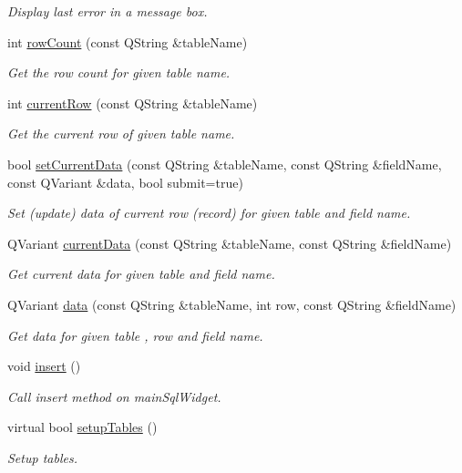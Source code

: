 \begin{DoxyCompactItemize}
\begin{DoxyCompactList}\small\item\em Display last error in a message box. \end{DoxyCompactList}\item 
int \hyperlink{classmdt_sql_form_a7d50c271fc506764ed20dd88914d0ddc}{rowCount} (const QString \&tableName)
\begin{DoxyCompactList}\small\item\em Get the row count for given table name. \end{DoxyCompactList}\item 
int \hyperlink{classmdt_sql_form_a855de08e9ddb3f7898ef4ceb0b0331f9}{currentRow} (const QString \&tableName)
\begin{DoxyCompactList}\small\item\em Get the current row of given table name. \end{DoxyCompactList}\item 
bool \hyperlink{classmdt_sql_form_aa377e70f4a2e865b0b696957c0fca766}{setCurrentData} (const QString \&tableName, const QString \&fieldName, const QVariant \&data, bool submit=true)
\begin{DoxyCompactList}\small\item\em Set (update) data of current row (record) for given table and field name. \end{DoxyCompactList}\item 
QVariant \hyperlink{classmdt_sql_form_aca283557b7e2586779cb5c498d388f14}{currentData} (const QString \&tableName, const QString \&fieldName)
\begin{DoxyCompactList}\small\item\em Get current data for given table and field name. \end{DoxyCompactList}\item 
QVariant \hyperlink{classmdt_sql_form_a0c27d6a9ecbf0589f313c7193c632a62}{data} (const QString \&tableName, int row, const QString \&fieldName)
\begin{DoxyCompactList}\small\item\em Get data for given table , row and field name. \end{DoxyCompactList}\item 
\hypertarget{classmdt_sql_form_a2138e4e1236a9b1c002825ddd9e59298}{
void \hyperlink{classmdt_sql_form_a2138e4e1236a9b1c002825ddd9e59298}{insert} ()}
\label{classmdt_sql_form_a2138e4e1236a9b1c002825ddd9e59298}

\begin{DoxyCompactList}\small\item\em Call insert method on mainSqlWidget. \end{DoxyCompactList}\item 
virtual bool \hyperlink{classmdt_sql_form_a27fe6e45aa5d4d7782aad9833e6de20b}{setupTables} ()
\begin{DoxyCompactList}\small\item\em Setup tables. \end{DoxyCompactList}\end{DoxyCompactItemize}
